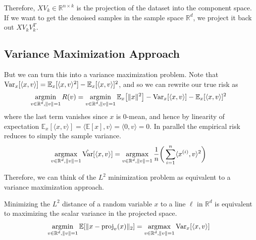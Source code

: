   Therefore, $X V_k \in \mathbb{R}^{n \times k}$ is the projection of the dataset into the component space. If we want to get the denoised samples in the sample space $\mathbb{R}^d$, we project it back out $X V_k V_k^T$. 

\subsection{Variance Maximization Approach}

  But we can turn this into a variance maximization problem. Note that $\operatorname{Var}_x [\langle x, v \rangle] = \mathbb{E}_x [ \langle x, v \rangle^2 ] - \mathbb{E}_x [ \langle x, v \rangle]^2$, and so we can rewrite our true risk as 
  \begin{align}
    \operatorname*{\arg\!\min}_{v \in \mathbb{R}^d, \|v\|=1} R(v) = \operatorname*{\arg\!\min}_{v \in \mathbb{R}^d, \|v\|=1} \mathbb{E}_x \big[ \|x\|^2 \big] - \operatorname{Var}_x [\langle x, v \rangle] - \mathbb{E}_x [ \langle x, v \rangle]^2
  \end{align} 
  where the last term vanishes since $x$ is $0$-mean, and hence by linearity of expectation $\mathbb{E}_x [\langle x, v \rangle] = \langle \mathbb{E}[x], v \rangle = \langle 0, v \rangle = 0$. In parallel the empirical risk reduces to simply the sample variance. 
  \begin{equation}
    \operatorname*{\arg\!\max}_{v \in \mathbb{R}^{d}, \|v\| = 1} \hat{\operatorname{Var}}[ \langle x, v \rangle] = \operatorname*{\arg\!\max}_{v \in \mathbb{R}^{d}, \|v\| = 1} \frac{1}{n} \bigg( \sum_{i=1}^n \langle x^{(i)}, v \rangle^2 \bigg)
  \end{equation} 

  Therefore, we can think of the $L^2$ minimization problem as equivalent to a variance maximization approach.  

  \begin{lemma}
    Minimizing the $L^2$ distance of a random variable $x$ to a line $\ell$ in $\mathbb{R}^d$ is equivalent to maximizing the scalar variance in the projected space. 
    \begin{equation}
      \operatorname*{\arg\!\min}_{v \in \mathbb{R}^d, \|v\| = 1} \mathbb{E} [ \| x - \operatorname{proj}_v (x) \|_2 ] = \operatorname*{\arg\!\max}_{v \in \mathbb{R}^d, \|v\| = 1} \operatorname{Var}_x [\langle x, v \rangle ]
    \end{equation}
  \end{lemma}

